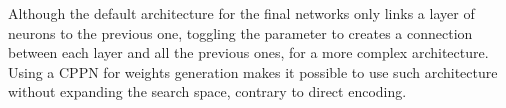 Although the default architecture for the final networks only links a layer of neurons to the previous one, toggling the  parameter to  creates a connection between each layer and all the previous ones, for a more complex architecture. Using a CPPN for weights generation makes it possible to use such architecture without expanding the search space, contrary to direct encoding. 

